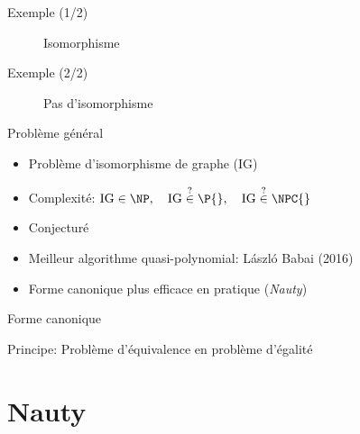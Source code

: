 \documentclass[11pt]{beamer}
\begin{document}
\begin{frame}{Exemple (1/2)}

\begin{figure}[h!]
    \centering
    \resizebox{0.9\textwidth}{!}{%
    }
    \caption{Isomorphisme}
    \end{figure}

\end{frame}


\begin{frame}{Exemple (2/2)}

    \begin{figure}[h!]
        \centering
        \resizebox{0.9\textwidth}{!}{%
        }
        \caption{Pas d'isomorphisme}
        \end{figure}
\end{frame}

\begin{frame}{Problème général}

\begin{itemize}
    \item Problème d'isomorphisme de graphe ($\mathrm{IG}$)
    \item Complexité: \(\mathrm{IG} \in \NP,\quad \mathrm{IG} \stackrel{?}{\in} \P{},\quad \mathrm{IG} \stackrel{?}{\in} \NPC{}\)
    \item Conjecturé \NPI{}
    \item Meilleur algorithme quasi-polynomial: László Babai (2016)
    \item Forme canonique plus efficace en pratique (\textit{Nauty})
\end{itemize}
\end{frame}

\begin{frame}{Forme canonique}

Principe: Problème d'équivalence en problème d'égalité

\begin{figure}[h!]
    \centering
    \resizebox{0.5\textwidth}{!}{%
    }
    \end{figure}

    
\end{frame}

\section{Nauty}
\end{document}
